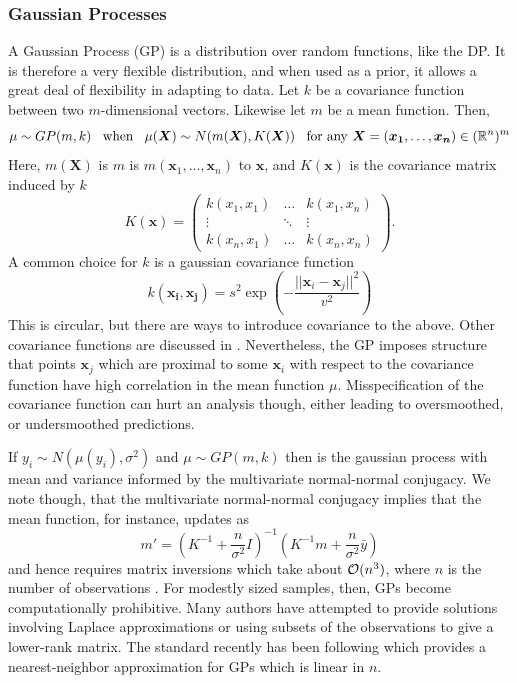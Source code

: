 \documentclass[twoside,12pt,bibstyle=chem-acs]{reedthesis}
\begin{document}
\subsubsection{Gaussian Processes}
A Gaussian Process (GP) is a distribution over random functions, like the DP. It is therefore a very flexible distribution, and when used as a prior, it allows a great deal of flexibility in adapting to data. Let $k$ be a covariance function between two $m$-dimensional vectors. Likewise let $m$ be a mean function. Then,
\begin{equation*}
\mu \sim GP(m,k) \hspace{0.025\linewidth}\text{when}\hspace{0.025\linewidth} \mu(\bm{X}) \sim N(m(\bm{X}), K(\bm{X})) \hspace{0.025\linewidth} \text{for any } \bm{X} = (\bm{x_1}, \dots, \bm{x_n}) \in (\R^{n})^m
\end{equation*}
Here, $m(\bm{X})$ is $m$ is $m(\bm{x}_1, \dots, \bm{x}_n)$ to $\bm{x}$, and $K(\bm{x})$ is the covariance matrix induced by $k$
\begin{equation*}
K(\bm{x}) = \begin{pmatrix}
k(x_1, x_1) & \dots & k(x_1, x_n) \\
\vdots & \ddots & \vdots \\
k(x_n, x_1) & \dots & k(x_n, x_n)
\end{pmatrix}.
\end{equation*}
A common choice for $k$ is a gaussian covariance function
\begin{equation*}
k(\bm{x_i},\bm{x_j}) = s^2 \exp\left(-\frac{||\bm{x}_i - \bm{x}_j||^2}{v^2}\right)
\end{equation*}
This is circular, but there are ways to introduce covariance to the above. Other covariance functions are discussed in \cite{find_something}. Nevertheless, the GP imposes structure that points $\bm{x}_j$ which are proximal to some $\bm{x}_i$ with respect to the covariance function have high correlation in the mean function $\mu$. Misspecification of the covariance function can hurt an analysis though, either leading to oversmoothed, or undersmoothed predictions.

If $y_i \sim N(\mu(y_i), \sigma^2)$ and $\mu \sim GP(m, k)$ then is the gaussian process with mean and variance informed by the multivariate normal-normal conjugacy. We note though, that the multivariate normal-normal conjugacy implies that the mean function, for instance, updates as
\begin{equation*}
m' = \left(K^{-1} + \frac{n}{\sigma^2}I\right)^{-1}\left(K^{-1}m + \frac{n}{\sigma^2}\bar{y}\right)
\end{equation*}
and hence requires matrix inversions which take about $\mathcal{O}(n^3)$, where $n$ is the number of observations \cite{gelman_bayesian_2014}. For modestly sized samples, then, GPs become computationally prohibitive. Many authors have attempted to provide solutions involving Laplace approximations or using subsets of the observations to give a lower-rank matrix. The standard recently has been following \citeauthor{datta_hierarchical_2016} which provides a nearest-neighbor approximation for GPs which is linear in $n$.
\end{document}
